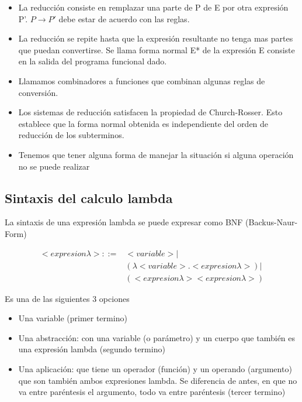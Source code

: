 \begin{itemize}
\item La reducción consiste en remplazar una parte de P de E por otra expresión P'. $P \rightarrow P'$ debe estar de acuerdo con las reglas.
\item La reducción se repite hasta que la expresión resultante no tenga mas partes que puedan convertirse. Se llama forma normal E* de la expresión E consiste en la salida del programa funcional dado.
\item Llamamos combinadores a funciones que combinan algunas reglas de conversión.
\item Los sistemas de reducción satisfacen la propiedad de Church-Rosser. Esto establece que la forma normal obtenida es independiente del orden de reducción de los subterminos.
\item Tenemos que tener alguna forma de manejar la situación si alguna operación no se puede realizar
\end{itemize}


\subsection*{Sintaxis del calculo lambda}

La sintaxis de una expresión lambda se puede expresar como BNF (Backus-Naur-Form)


\begin{equation*} \label{eq1}
\begin{split}
<expresion \lambda> ::= & <variable> |\\
& (\lambda <variable>.<expresion \lambda>) |\\
& (<expresion \lambda><expresion \lambda>)
\end{split}
\end{equation*}


Es una de las siguientes 3 opciones
\begin{itemize}
\item Una variable (primer termino)
\item Una abstracción: con una variable (o parámetro) y un cuerpo que también es una expresión lambda (segundo termino)
\item Una aplicación: que tiene un operador (función) y un operando (argumento) que son también ambos expresiones lambda. Se diferencia de antes, en que no va entre paréntesis el argumento, todo va entre paréntesis (tercer termino)
\end{itemize}


